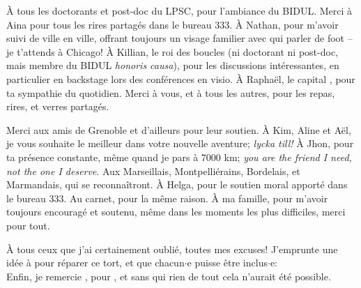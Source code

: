 À tous les doctorants et post-doc du LPSC, pour l'ambiance du BIDUL.
Merci à Aina pour tous les rires partagés dans le bureau 333.
À Nathan, pour m'avoir suivi de ville en ville, offrant toujours un visage familier avec qui parler de foot  -- je t'attends à Chicago!
À Killian, le roi des boucles (ni doctorant ni post-doc, mais membre du BIDUL \textit{honoris causa}), pour les discussions intéressantes, en particulier en backstage lors des conférences en visio.
À Raphaël, le capital , pour ta sympathie du quotidien.
Merci à vous, et à tous les autres, pour les repas, rires, et verres partagés.

Merci aux amis de Grenoble et d'ailleurs pour leur soutien.
À Kim, Aline et Aël, je vous souhaite le meilleur dans votre nouvelle aventure; \textit{lycka till!}
À Jhon, pour ta présence constante, même quand je pars à 7000 km; \textit{you are the friend I need, not the one I deserve}.
Aux Marseillais, Montpelliérains, Bordelais, et Marmandais, qui se reconnaîtront.
À Helga, pour le soutien moral apporté dans le bureau 333.
Au carnet, pour la même raison.
À ma famille, pour m'avoir toujours encouragé et soutenu, même dans les moments les plus difficiles, merci pour tout.

À tous ceux que j'ai certainement oublié, toutes mes excuses!
J'emprunte une idée à \cite{maurin_propagation_2001} pour réparer ce tort, et que chacun$\cdot$e puisse être inclus$\cdot$e: \\
Enfin, je remercie \fbox{\phantom{Florian Kéruzoré}}, pour \fbox{\phantom{avoir existé aussi longtemps}}, et sans qui rien de tout cela n'aurait été possible.
